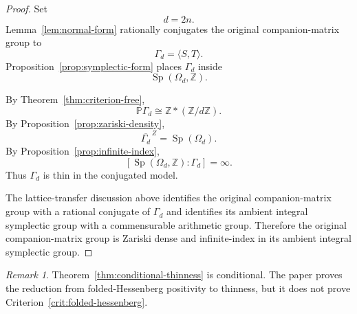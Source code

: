 \documentclass[a4paper,11pt]{amsart}
\newcommand{\Z}{\mathbb Z}
\newcommand{\Pj}{\mathbb P}
\newcommand{\Sp}{\operatorname{Sp}}
\theoremstyle{remark}
\newtheorem{remark}[theorem]{Remark}
\numberwithin{equation}{section}
\begin{document}
\begin{proof}
Set
\[
d=2n.
\]
Lemma~\ref{lem:normal-form} rationally conjugates the original companion-matrix group to
\[
\Gamma_d=\langle S,T\rangle.
\]
Proposition~\ref{prop:symplectic-form} places \(\Gamma_d\) inside
\[
\Sp(\Omega_d,\Z).
\]

By Theorem~\ref{thm:criterion-free},
\[
\Pj\Gamma_d\cong\Z*(\Z/d\Z).
\]
By Proposition~\ref{prop:zariski-density},
\[
\overline{\Gamma_d}^{\,Z}=\Sp(\Omega_d).
\]
By Proposition~\ref{prop:infinite-index},
\[
[\Sp(\Omega_d,\Z):\Gamma_d]=\infty.
\]
Thus \(\Gamma_d\) is thin in the conjugated model.

The lattice-transfer discussion above identifies the original companion-matrix group with a rational conjugate of \(\Gamma_d\) and identifies its ambient integral symplectic group with a commensurable arithmetic group. Therefore the original companion-matrix group is Zariski dense and infinite-index in its ambient integral symplectic group.
\end{proof}

\begin{remark}
Theorem~\ref{thm:conditional-thinness} is conditional. The paper proves the reduction from folded-Hessenberg positivity to thinness, but it does not prove Criterion~\ref{crit:folded-hessenberg}.
\end{remark}
\end{document}
